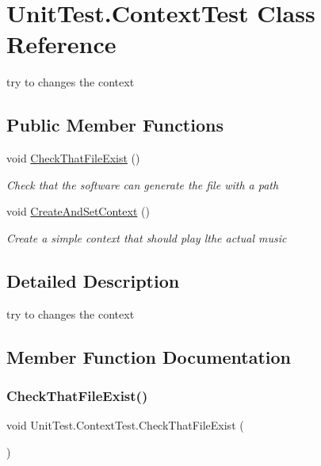 \hypertarget{class_unit_test_1_1_context_test}{}\section{Unit\+Test.\+Context\+Test Class Reference}
\label{class_unit_test_1_1_context_test}


try to changes the context  


\subsection*{Public Member Functions}
\begin{DoxyCompactItemize}
\item 
void \hyperlink{class_unit_test_1_1_context_test_a1aa333b50df25d11a98848910ccc40c0}{Check\+That\+File\+Exist} ()
\begin{DoxyCompactList}\small\item\em Check that the software can generate the file with a path \end{DoxyCompactList}\item 
void \hyperlink{class_unit_test_1_1_context_test_ae26d0ac0f712020e05ddc3c4aca1c8f3}{Create\+And\+Set\+Context} ()
\begin{DoxyCompactList}\small\item\em Create a simple context that should play lthe actual music \end{DoxyCompactList}\end{DoxyCompactItemize}


\subsection{Detailed Description}
try to changes the context 



\subsection{Member Function Documentation}
\mbox{\label{class_unit_test_1_1_context_test_a1aa333b50df25d11a98848910ccc40c0}} 
\subsubsection{\texorpdfstring{Check\+That\+File\+Exist()}{CheckThatFileExist()}}
{\footnotesize\ttfamily void Unit\+Test.\+Context\+Test.\+Check\+That\+File\+Exist (\begin{DoxyParamCaption}{ }\end{DoxyParamCaption})}



